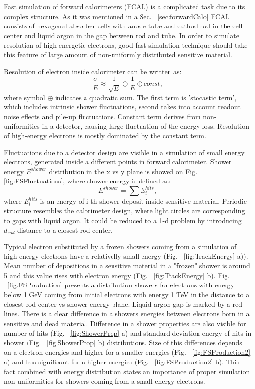 Fast simulation of forward calorimeters (FCAL) is a complicated task due to its complex structure. As it was mentioned in a Sec. ~\ref{sec:forwardCalo} FCAL consists of hexagonal absorber cells with anode tube and cathod rod in the cell center and liquid argon in the gap between rod and tube. In order to simulate resolution of high energetic electrons, good fast simulation technique should take this feature of large amount of non-uniformly distributed sensitive material.

Resolution of electron inside calorimeter can be written as:
\begin{equation}\label{eq:EMResoultion}
\frac{\sigma}{E} \approx \frac{1}{\sqrt{E}}	\oplus \frac{1}{E} 	\oplus const,
\end{equation}
where symbol $\oplus$ indicates a quadratic sum. The first term is 'stocastic term', which includes intrinsic shower fluctuations, second takes into account readout noise effects and pile-up fluctuations. Constant term derives from non-uniformities in a detector, causing large fluctuation of the energy loss. Resolution of high-energy electrons is mostly dominated by the constant term. 

Fluctuations due to a detector design are visible in a simulation of small energy electrons, generated inside a different points in forward calorimeter. Shower energy $E^{shower}$ distribution in the x vs y plane is showed on Fig. \ref{fig:FSFluctuations}, where shower energy is defined as:
\begin{equation}
E^{shower}=\sum E_i^{hits},
\end{equation}
where $E_i^{hits}$ is an energy of i-th shower deposit inside sensitive material. Periodic structure resembles the calorimeter design, where light circles are corresponding to gaps with liquid argon. It could be reduced to a 1-d problem by introducing $d_{rod}$ distance to a closest rod center. 

Typical electron substituted by a frozen showers coming from a simulation of high energy electrons have a relativelly small energy (Fig. ~\ref{fig:TrackEnergy} a)). Mean number of depositions in a sensitive material in a "frozen" shower is around 5 and this value rises with electron energy (Fig. ~\ref{fig:TrackEnergy} b).  Fig. ~\ref{fig:FSProduction} presents a distribution showers for electrons with energy below 1 GeV coming from initial electrons with energy 1 TeV in the distance to a closest rod center vs shower energy plane. Liquid argon gap is marked by a red lines. There is a clear difference in a showers energies between electrons born in a sensitive and dead material. Difference in a shower properties are also visible for number of hits  (Fig. ~\ref{fig:ShowerProp} a) and standard deviation energy of hits in shower (Fig. ~\ref{fig:ShowerProp} b) distributions. Size of this differences depends on a electron energies and higher for a smaller energies (Fig. ~\ref{fig:FSProduction2} a) and less significant for a higher energies (Fig. ~\ref{fig:FSProduction2} b).  This fact combined with energy distribution states an importance of proper simulation non-uniformities for showers coming from a small energy electrons.





